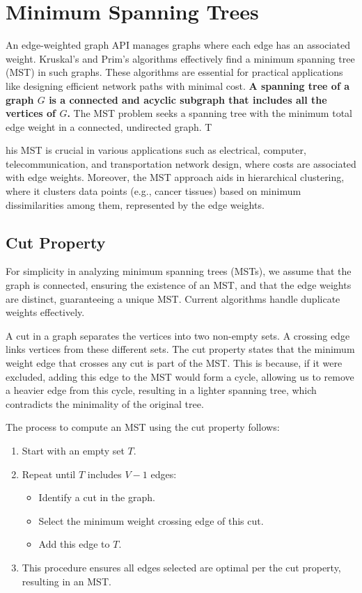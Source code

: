 \documentclass{article}
\begin{document}
\section{Minimum Spanning Trees}

An edge-weighted graph API manages graphs where each edge has an associated weight. Kruskal's and Prim's algorithms effectively find a minimum spanning tree (MST) in such graphs. These algorithms are essential for practical applications like designing efficient network paths with minimal cost. 
\textbf{A spanning tree of a graph $G$ is a connected and acyclic subgraph that includes all the vertices of $G$.}
The MST problem seeks a spanning tree with the minimum total edge weight in a connected, undirected graph. T

his MST is crucial in various applications such as electrical, computer, telecommunication, and transportation network design, where costs are associated with edge weights. Moreover, the MST approach aids in hierarchical clustering, where it clusters data points (e.g., cancer tissues) based on minimum dissimilarities among them, represented by the edge weights.

\subsection{Cut Property}
For simplicity in analyzing minimum spanning trees (MSTs), we assume that the graph is connected, ensuring the existence of an MST, and that the edge weights are distinct, guaranteeing a unique MST. Current algorithms handle duplicate weights effectively.

A cut in a graph separates the vertices into two non-empty sets. A crossing edge links vertices from these different sets. The cut property states that the minimum weight edge that crosses any cut is part of the MST. This is because, if it were excluded, adding this edge to the MST would form a cycle, allowing us to remove a heavier edge from this cycle, resulting in a lighter spanning tree, which contradicts the minimality of the original tree.

The process to compute an MST using the cut property follows:
\begin{enumerate}
  \item Start with an empty set $T$.
  \item Repeat until $T$ includes $V-1$ edges:
    \begin{itemize}
      \item Identify a cut in the graph.
      \item Select the minimum weight crossing edge of this cut.
      \item Add this edge to $T$.
    \end{itemize}
  \item This procedure ensures all edges selected are optimal per the cut property, resulting in an MST.
\end{enumerate}
\end{document}
